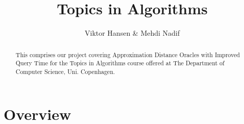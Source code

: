 \documentclass[12pt]{article}
\begin{document}
\nocite{*}


\title{Topics in Algorithms}

\author{Viktor Hansen \& Mehdi Nadif}

\maketitle

\begin{abstract}
  This comprises our project covering Approximation Distance Oracles with Improved Query Time for the Topics in Algorithms course offered at The Department of Computer Science, Uni. Copenhagen.
\end{abstract}

\pagebreak

\section{Overview}
\end{document}
